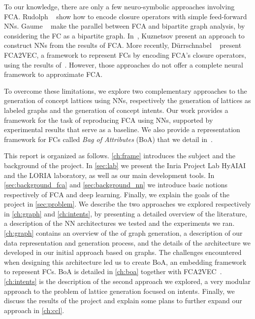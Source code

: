 To our knowledge, there are only a few neuro-symbolic approaches involving FCA.
Rudolph \etal{}~\cite{encoding:2007:rudolph} show how to encode closure operators with simple feed-forward NNs.
Gaume \etal{}~\cite{clustering-bipartie-closure:2013:gaume} make the parallel between FCA and bipartite graph analysis, by considering the FC as a bipartite graph. %
In~\cite{lattice-based-nn:2017:kuznetsov}, Kuznetsov \etal{} present an approach to construct NNs from the results of FCA.
More recently, Dürrschnabel \etal{}~\cite{fca2vec:2019:durrschnabel} present FCA2VEC, a framework to represent FCs by encoding FCA's closure operators, using the results of~\cite{encoding:2007:rudolph}.
However, those approaches do not offer a complete neural framework to approximate FCA.

To overcome these limitations, we explore two complementary approaches to the generation of concept lattices using NNs, respectively the generation of lattices as labeled graphs and the generation of concept intents.
Our work provides a framework for the task of reproducing FCA using NNs, supported by experimental results that serve as a baseline.
We also provide a representation framework for FCs called \textit{Bag of Attributes} (BoA) that we detail in~\cite{boa:2020:marquer}.

This report is organized as follows.
\cref{ch:frame} introduces the subject and the background of the project. %
In \cref{sec:lab} we present the Inria Project Lab HyAIAI and the LORIA laboratory, as well as our main development tools. In \cref{sec:background_fca} and \cref{sec:background_nn} we introduce basic notions respectively of FCA and deep learning.
Finally, we explain the goals of the project in \cref{sec:problem}.
%
We describe the two approaches we explored respectively in \cref{ch:graph} and \cref{ch:intents}, by presenting a detailed overview of the literature, a description of the NN architectures we tested and the experiments we ran.
\cref{ch:graph} contains an overview of the \soa{} of graph generation, a description of our data representation and generation process, and the details of the architecture we developed in our initial approach based on graphs.
The challenges encountered when designing this architecture led us to create BoA, an embedding framework to represent FCs.
BoA is detailed in \cref{ch:boa} together with FCA2VEC~\cite{fca2vec:2019:durrschnabel}.
\cref{ch:intents} is the description of the second approach we explored, a very modular approach to the problem of lattice generation focused on intents.
Finally, we discuss the results of the project and explain some plans to further expand our approach in \cref{ch:ccl}.